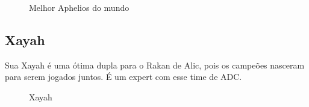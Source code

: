\begin{multicols}{2}
	\begin{figure}[H]
		\centering
		\caption{Melhor Aphelios do mundo}
		\label{fig:fig7}
	\end{figure}
	
	\subsection*{Xayah}
	Sua Xayah é uma ótima dupla para o Rakan de Alic, pois os campeões nasceram para serem jogados juntos. É um expert com esse time de ADC.
	\begin{figure}[H]
		\centering
		\caption{Xayah}
		\label{fig:fig8}
	\end{figure}
	

\end{multicols}
